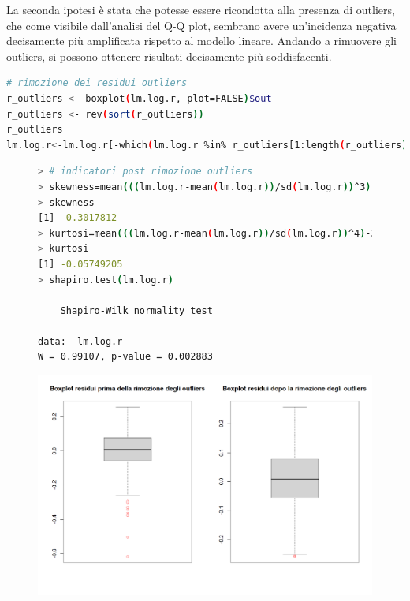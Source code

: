 \documentclass[11pt,a4paper]{article}
\begin{document}
La seconda ipotesi è stata che potesse essere ricondotta alla presenza di outliers, che come visibile dall'analisi del Q-Q plot, sembrano avere un'incidenza negativa decisamente più amplificata rispetto al modello lineare.
Andando a rimuovere gli outliers, si possono ottenere risultati decisamente più soddisfacenti.

\vspace{0.5cm}
\begin{lstlisting}[language=bash,basicstyle=\tiny,tabsize=2,frame = single]
# rimozione dei residui outliers
r_outliers <- boxplot(lm.log.r, plot=FALSE)$out
r_outliers <- rev(sort(r_outliers))
r_outliers
lm.log.r<-lm.log.r[-which(lm.log.r %in% r_outliers[1:length(r_outliers)])]

\end{lstlisting}

\begin{figure}[h]
    \vspace{-0.3cm}
    \hspace{-2.00cm}
    \begin{minipage}{.6\textwidth} 
    	\begin{lstlisting}[language=bash,basicstyle=\tiny,tabsize=2,frame = single]
> # indicatori post rimozione outliers
> skewness=mean(((lm.log.r-mean(lm.log.r))/sd(lm.log.r))^3)
> skewness
[1] -0.3017812
> kurtosi=mean(((lm.log.r-mean(lm.log.r))/sd(lm.log.r))^4)-3
> kurtosi
[1] -0.05749205
> shapiro.test(lm.log.r)

	Shapiro-Wilk normality test

data:  lm.log.r
W = 0.99107, p-value = 0.002883
    	\end{lstlisting}
    \end{minipage}
    \hspace{0.04\textwidth}%
    \begin{minipage}{0.5\textwidth} 
        \includegraphics[scale=0.35]{imgs/boxplots_residuals.png}
    \end{minipage}
\end{figure}
\vspace{-1.6cm}
\end{document}
